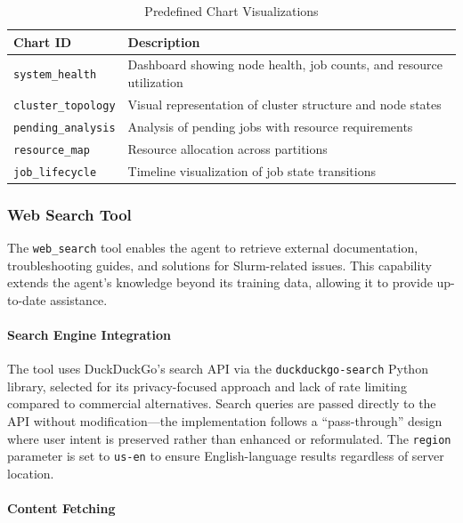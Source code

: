 \begin{table}[H]
    \centering
    \caption{Predefined Chart Visualizations}
    \label{tab:chart-scripts}
    \small
    \begin{tabular}{|l|p{8cm}|}
        \hline
        \textbf{Chart ID} & \textbf{Description} \\
        \hline
        \texttt{system\_health} & Dashboard showing node health, job counts, and resource utilization \\
        \texttt{cluster\_topology} & Visual representation of cluster structure and node states \\
        \texttt{pending\_analysis} & Analysis of pending jobs with resource requirements \\
        \texttt{resource\_map} & Resource allocation across partitions \\
        \texttt{job\_lifecycle} & Timeline visualization of job state transitions \\
        \hline
    \end{tabular}
\end{table}

\subsubsection{Web Search Tool}

The \texttt{web\_search} tool enables the agent to retrieve external documentation, troubleshooting guides, and solutions for Slurm-related issues. This capability extends the agent's knowledge beyond its training data, allowing it to provide up-to-date assistance.

\paragraph{Search Engine Integration}

The tool uses DuckDuckGo's search API via the \texttt{duckduckgo-search} Python library, selected for its privacy-focused approach and lack of rate limiting compared to commercial alternatives. Search queries are passed directly to the API without modification---the implementation follows a ``pass-through'' design where user intent is preserved rather than enhanced or reformulated. The \texttt{region} parameter is set to \texttt{us-en} to ensure English-language results regardless of server location.

\paragraph{Content Fetching}

